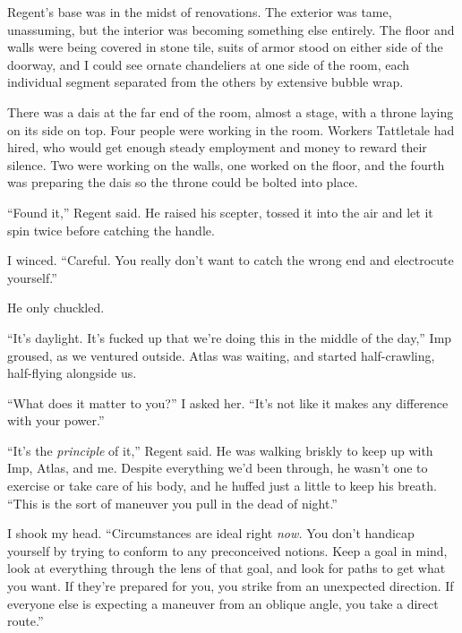 





Regent's base was in the midst of renovations.  The exterior was tame, unassuming, but the interior was becoming something else entirely.  The floor and walls were being covered in stone tile, suits of armor stood on either side of the doorway, and I could see ornate chandeliers at one side of the room, each individual segment separated from the others by extensive bubble wrap.



There was a dais at the far end of the room, almost a stage, with a throne laying on its side on top.  Four people were working in the room.  Workers Tattletale had hired, who would get enough steady employment and money to reward their silence.  Two were working on the walls, one worked on the floor, and the fourth was preparing the dais so the throne could be bolted into place.



``Found it,'' Regent said.  He raised his scepter, tossed it into the air and let it spin twice before catching the handle.



I winced.  ``Careful.  You really don't want to catch the wrong end and electrocute yourself.''



He only chuckled.



``It's daylight.  It's fucked up that we're doing this in the middle of the day,'' Imp groused, as we ventured outside.  Atlas was waiting, and started half-crawling, half-flying alongside us.



``What does it matter to you?'' I asked her.  ``It's not like it makes any difference with your power.''



``It's the \emph{principle} of it,'' Regent said.  He was walking briskly to keep up with Imp, Atlas, and me.  Despite everything we'd been through, he wasn't one to exercise or take care of his body, and he huffed just a little to keep his breath. ``This is the sort of maneuver you pull in the dead of night.''



I shook my head.  ``Circumstances are ideal right \emph{now.  }You don't handicap yourself by trying to conform to any preconceived notions.  Keep a goal in mind, look at everything through the lens of that goal, and look for paths to get what you want.  If they're prepared for you, you strike from an unexpected direction.  If everyone else is expecting a maneuver from an oblique angle, you take a direct route.''



